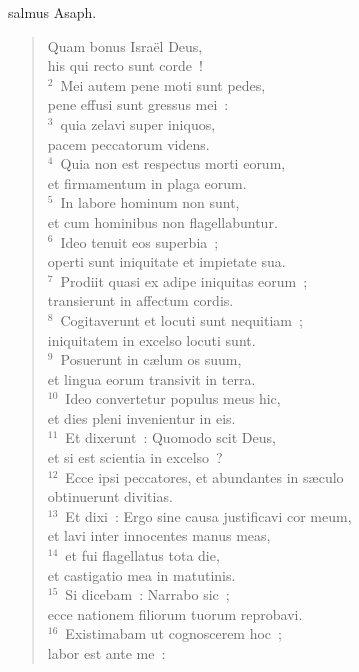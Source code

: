 \bchapter[Psalm]
salmus Asaph. \begin{verse}Quam bonus Isra\"el Deus,\\ his qui recto sunt corde~!\\
${}^{2}$~Mei autem pene moti sunt pedes,\\ pene effusi sunt gressus mei~:\\
${}^{3}$~quia zelavi super iniquos,\\ pacem peccatorum videns.\\
${}^{4}$~Quia non est respectus morti eorum,\\ et firmamentum in plaga eorum.\\
${}^{5}$~In labore hominum non sunt,\\ et cum hominibus non flagellabuntur.\\
${}^{6}$~Ideo tenuit eos superbia~;\\ operti sunt iniquitate et impietate sua.\\
${}^{7}$~Prodiit quasi ex adipe iniquitas eorum~;\\ transierunt in affectum cordis.\\
${}^{8}$~Cogitaverunt et locuti sunt nequitiam~;\\ iniquitatem in excelso locuti sunt.\\
${}^{9}$~Posuerunt in c\ae lum os suum,\\ et lingua eorum transivit in terra.\\
${}^{10}$~Ideo convertetur populus meus hic,\\ et dies pleni invenientur in eis.\\
${}^{11}$~Et dixerunt~: Quomodo scit Deus,\\ et si est scientia in excelso~?\\
${}^{12}$~Ecce ipsi peccatores, et abundantes in s\ae culo\\ obtinuerunt divitias.\\
${}^{13}$~Et dixi~: Ergo sine causa justificavi cor meum,\\ et lavi inter innocentes manus meas,\\
${}^{14}$~et fui flagellatus tota die,\\ et castigatio mea in matutinis.\\
${}^{15}$~Si dicebam~: Narrabo sic~;\\ ecce nationem filiorum tuorum reprobavi.\\
${}^{16}$~Existimabam ut cognoscerem hoc~;\\ labor est ante me~:\\

\end{verse}
